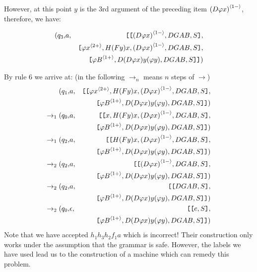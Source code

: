 However, at this point $y$ is the $3$rd argument of the preceding
item ${(D \varphi x)}^{\langle{1-}\rangle}$, therefore, we have:

\begin{eqnarray}
\nonumber (q_3, & a, & \hbox{\tt [}\hbox{\tt [}{{(D \varphi x)}^{\langle{1-}\rangle}, DGAB, S}\hbox{\tt ]}, \\
\nonumber & & \hbox{\tt [}{{\varphi x}^{\langle{2+}\rangle},H (F y) x,{(D \varphi x)}^{\langle{1-}\rangle}, DGAB, S}\hbox{\tt ]},\\
\nonumber & &\hbox{\tt [}{{\varphi B}^{\langle{1+}\rangle}, D (D \varphi x) y (\varphi
y), DGAB,S}\hbox{\tt ]}\hbox{\tt ]})
\end{eqnarray}

By rule $6$ we arrive at: (in the following $\rightarrow_n$ means
$n$ steps of $\rightarrow$)
\begin{eqnarray}
\nonumber (q_1, & a, & \hbox{\tt [}\hbox{\tt [}{{\varphi x}^{\langle{2+}\rangle},H (F y) x,{(D \varphi x)}^{\langle{1-}\rangle}, DGAB, S}\hbox{\tt ]},\\
\nonumber & & \hbox{\tt [}{{\varphi B}^{\langle{1+}\rangle}, D (D \varphi x) y (\varphi y),
DGAB,S}\hbox{\tt ]}\hbox{\tt ]} )\\
\nonumber \rightarrow_1  (q_0, & a, & \hbox{\tt [}
\hbox{\tt [}{x,H (F y) x,{(D \varphi x)}^{\langle{1-}\rangle}, DGAB, S}\hbox{\tt ]},\\
\nonumber && \hbox{\tt [}{{\varphi B}^{\langle{1+}\rangle}, D (D \varphi x) y (\varphi y),
DGAB,S}\hbox{\tt ]} \hbox{\tt ]})\\
\nonumber \rightarrow_1 (q_2, & a, &\hbox{\tt [}\hbox{\tt [}{H (F y) x,{(D \varphi x)}^{\langle{1-}\rangle}, DGAB, S}\hbox{\tt ]},\\
\nonumber & &\hbox{\tt [}{{\varphi B}^{\langle{1+}\rangle}, D (D \varphi x) y (\varphi
y), DGAB,S}\hbox{\tt ]}\hbox{\tt ]})\\
\nonumber \rightarrow_2 (q_2, & a, & \hbox{\tt [}\hbox{\tt [}{{(D \varphi x)}^{\langle{1-}\rangle}, DGAB, S}\hbox{\tt ]},\\
\nonumber & &\hbox{\tt [}{{\varphi B}^{\langle{1+}\rangle}, D (D \varphi x) y (\varphi
y), DGAB,S}\hbox{\tt ]}\hbox{\tt ]}
)\\
\nonumber \rightarrow_2 (q_2, & a, & \hbox{\tt [}\hbox{\tt [}{DGAB, S}\hbox{\tt ]},\\
\nonumber && \hbox{\tt [}{{\varphi B}^{\langle{1+}\rangle}, D (D \varphi x) y (\varphi
y), DGAB,S}\hbox{\tt ]}\hbox{\tt ]}
)\\
\nonumber \rightarrow_2 (q_0, & \epsilon, & \hbox{\tt [}\hbox{\tt [}{e, S}\hbox{\tt ]},\\
\nonumber &&\hbox{\tt [}{{\varphi B}^{\langle{1+}\rangle}, D (D \varphi x) y (\varphi
y), DGAB,S}\hbox{\tt ]}\hbox{\tt ]}
)
\end{eqnarray}
Note that we have accepted $h_1h_3h_2f_1a$ which is incorrect! Their
construction only works under the assumption that the grammar is
safe. However, the labels we have used lead us to the construction of
a machine which can remedy this problem.


